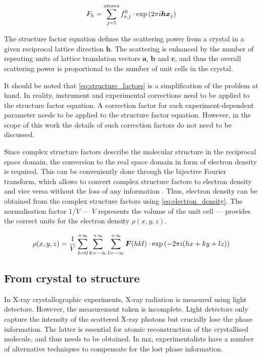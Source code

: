 \begin{equation}
    F_h=\sum_{j=1}^{atoms}f_{s,j}^0 \cdot \exp\left(2\pi\\i\boldsymbol{h}\boldsymbol{x}_j\right)
    \label{eq:structure_factors}
\end{equation}

The structure factor equation defines the scattering power from a crystal in a given reciprocal lattice direction $\boldsymbol{h}$. The scattering is enhanced by the number of repeating units of lattice translation vectors $\boldsymbol{a}$, $\boldsymbol{b}$ and $\boldsymbol{c}$, and thus the overall scattering power is proportional to the number of unit cells in the crystal.

It should be noted that \cref{eq:structure_factors} is a simplification of the problem at hand. In reality, instrument and experimental corrections need to be applied to the structure factor equation. A correction factor for each experiment-dependent parameter needs to be applied to the structure factor equation. However, in the scope of this work the details of such correction factors do not need to be discussed.

Since complex structure factors describe the molecular structure in the reciprocal space domain, the conversion to the real space domain in form of electron density is required. This can be conveniently done through the bijective Fourier transform, which allows to convert complex structure factors to electron density and vice versa without the loss of any information \cite{Rupp2010-nc}. Thus, electron density can be obtained from the complex structure factors using \cref{eq:electron_density}. The normalisation factor $1/V$ --- $V$ represents the volume of the unit cell --- provides the correct units for the electron density $\rho(x,y,z)$.

\begin{equation}
    \rho(x,y,z)=\frac{1}{V}\sum_{h=0}^{+\infty}\sum_{k=-\infty}^{+\infty}\sum_{l=-\infty}^{+\infty}\boldsymbol{F}(hkl)\cdot \exp\left(-2\pi\\i(hx+ky+lz)\right)
    \label{eq:electron_density}
\end{equation}

\subsection{From crystal to structure}
In X-ray crystallographic experiments, X-ray radiation is measured using light detectors. However, the measurement taken is incomplete. Light detectors only capture the intensity of the scattered X-ray photons but crucially lose the phase information. The latter is essential for atomic reconstruction of the crystallised molecule, and thus needs to be obtained. In \gls{mx}, experimentalists have a number of alternative techniques to compensate for the lost phase information. 

